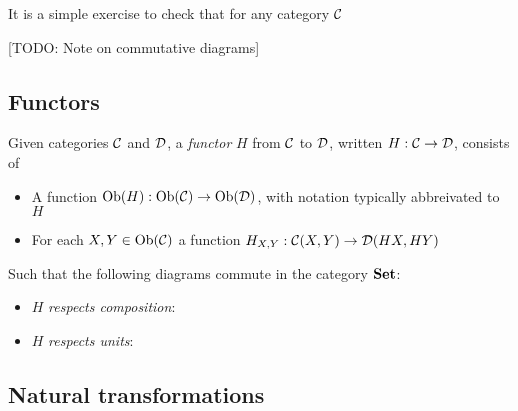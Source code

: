 \begin{remark}
    It is a simple exercise to check that for any category $\mathcal{C}$
\end{remark}

[TODO: Note on commutative diagrams]

\subsection{Functors}

\begin{defin}
    Given categories $\mathcal{C}$ and $\mathcal{D}$, a \emph{functor} $H$ from $\mathcal{C}$ to $\mathcal{D}$, written $H : \mathcal{C} \to \mathcal{D}$, consists of
    \begin{itemize}
        \item A function $\text{Ob}(H) : \text{Ob}(\mathcal{C}) \to \text{Ob}(\mathcal{D})$, with notation typically abbreivated to $H$
        \item For each $X, Y \in \text{Ob}(\mathcal{C})$ a function $H_{X,Y} : \mathcal{C}(X, Y) \to \mathcal{D}(HX,HY)$
    \end{itemize}
    Such that the following diagrams commute in the category ${\normalfont\textbf{Set}}$:
    \begin{itemize}
        \item $H$ \textit{respects composition}:
        \begin{center}
        \end{center}
        \item $H$ \textit{respects units}:
        \begin{center}
        \end{center}
    \end{itemize}
\end{defin}

\subsection{Natural transformations}

